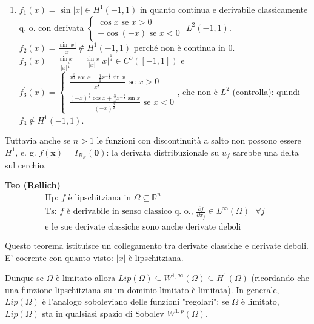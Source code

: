 \documentclass{article}
\begin{document}
\begin{enumerate}
\item $f_{1}\left( x\right) =\sin \left\vert x\right\vert \in H^{1}\left(
-1,1\right) $ in quanto continua e derivabile classicamente q. o. con
derivata $\left\{ 
\begin{array}{c}
\cos x\text{ se }x>0 \\ 
-\cos \left( -x\right) \text{ se }x<0%
\end{array}%
\right. $ $L^{2}\left( -1,1\right) $. $f_{2}\left( x\right) =\frac{\sin
\left\vert x\right\vert }{x}\not\in H^{1}\left( -1,1\right) $ perch\'{e} non 
\`{e} continua in $0$. $f_{3}\left( x\right) =\frac{\sin x}{\left\vert
x\right\vert ^{\frac{3}{4}}}=\frac{\sin x}{\left\vert x\right\vert }%
\left\vert x\right\vert ^{\frac{1}{4}}\in C^{0}\left( \left[ -1,1\right]
\right) $ e $f_{3}^{\prime }\left( x\right) =\left\{ 
\begin{array}{c}
\frac{x^{\frac{3}{4}}\cos x-\frac{3}{4}x^{-\frac{1}{4}}\sin x}{x^{\frac{3}{2}%
}}\text{ se }x>0 \\ 
\frac{\left( -x\right) ^{\frac{3}{4}}\cos x+\frac{3}{4}x^{-\frac{1}{4}}\sin x%
}{\left( -x\right) ^{\frac{3}{2}}}\text{ se }x<0%
\end{array}%
\right. $, che non \`{e} $L^{2}$ (controlla): quindi $f_{3}\not\in
H^{1}\left( -1,1\right) $.
\end{enumerate}

Tuttavia anche se $n>1$ le funzioni con discontinuit\`{a} a salto non
possono essere $H^{1}$, e. g. $f\left( \mathbf{x}\right) =I_{B_{R}}\left( 
\mathbf{0}\right) $: la derivata distribuzionale su $u_{f}$ sarebbe una
delta sul cerchio.

\textbf{Teo (Rellich)}%
\begin{gather*}
\text{Hp: }f\text{ \`{e} lipschitziana in }\Omega \subseteq 
\mathbb{R}
^{n} \\
\text{Ts: }f\text{ \`{e} derivabile in senso classico q. o., }\frac{\partial
f}{\partial x_{j}}\in L^{\infty }\left( \Omega \right) \text{ }\forall \text{
}j\text{ } \\
\text{e le sue derivate classiche sono anche derivate deboli}
\end{gather*}

Questo teorema istituisce un collegamento tra derivate classiche e derivate
deboli. E' coerente con quanto visto: $\left\vert x\right\vert $ \`{e}
lipschitziana.

Dunque se $\Omega $ \`{e} limitato allora $Lip\left( \Omega \right)
\subseteq W^{1,\infty }\left( \Omega \right) \subseteq H^{1}\left( \Omega
\right) $ (ricordando che una funzione lipschitziana su un dominio limitato 
\`{e} limitata). In generale, $Lip\left( \Omega \right) $ \`{e} l'analogo
soboleviano delle funzioni "regolari": se $\Omega $ \`{e} limitato, $%
Lip\left( \Omega \right) $ sta in qualsiasi spazio di Sobolev $W^{1,p}\left(
\Omega \right) $.
\end{document}
